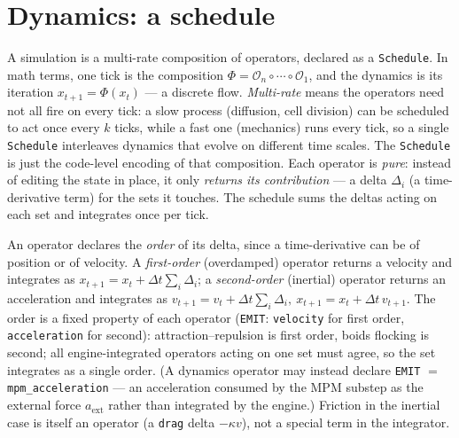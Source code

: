 \documentclass[11pt]{article}
\newcommand{\code}[1]{\texttt{#1}}
\begin{document}
\section{Dynamics: a schedule}
\label{sec:schedule}

A simulation is a multi-rate composition of operators, declared as a
\code{Schedule}. In math terms, one tick is the composition
$\Phi=\mathcal{O}_n\circ\cdots\circ\mathcal{O}_1$, and the dynamics is its
iteration $x_{t+1}=\Phi(x_t)$ --- a discrete flow. \emph{Multi-rate} means the
operators need not all fire on every tick: a slow process (diffusion, cell
division) can be scheduled to act once every $k$ ticks, while a fast one
(mechanics) runs every tick, so a single \code{Schedule} interleaves dynamics
that evolve on different time scales. The \code{Schedule} is just the code-level
encoding of that composition. Each operator is \emph{pure}: instead of
editing the state in place, it only \emph{returns its contribution} --- a delta
$\Delta_i$ (a time-derivative term) for the sets it touches. The schedule sums the
deltas acting on each set and integrates once per tick.

An operator declares the \emph{order} of its delta, since a time-derivative can be
of position or of velocity. A \emph{first-order} (overdamped) operator returns a
velocity and integrates as $x_{t+1}=x_t+\Delta t\sum_i\Delta_i$; a
\emph{second-order} (inertial) operator returns an acceleration and integrates as
$v_{t+1}=v_t+\Delta t\sum_i\Delta_i,\ x_{t+1}=x_t+\Delta t\,v_{t+1}$. The order is
a fixed property of each operator (\code{EMIT}: \code{velocity} for first order,
\code{acceleration} for second): attraction--repulsion is first order, boids flocking
is second; all engine-integrated operators acting on one set must agree, so the set
integrates as a single order. (A dynamics operator may instead declare \code{EMIT} $=$
\code{mpm\_acceleration} --- an acceleration consumed by the MPM substep as the external
force $a_\text{ext}$ rather than integrated by the engine.) Friction in the inertial case
is itself an operator (a \code{drag} delta $-\kappa v$), not a special term in the integrator.
\end{document}
